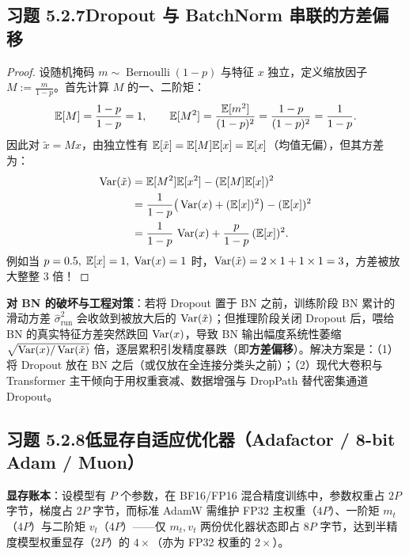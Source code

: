 \subsection*{习题 5.2.7\quad Dropout 与 BatchNorm 串联的方差偏移}
\begin{proof}
设随机掩码 $m \sim \operatorname{Bernoulli}(1-p)$ 与特征 $x$ 独立，定义缩放因子 $M := \frac{m}{1-p}$。首先计算 $M$ 的一、二阶矩：
\[
  \mathbb{E}[M] = \frac{1 - p}{1 - p} = 1, \qquad
  \mathbb{E}[M^2] = \frac{\mathbb{E}[m^2]}{(1-p)^2} = \frac{1 - p}{(1-p)^2} = \frac{1}{1 - p}.
\]
因此对 $\tilde{x} = M x$，由独立性有 $\mathbb{E}[\tilde{x}] = \mathbb{E}[M]\mathbb{E}[x] = \mathbb{E}[x]$（均值无偏），但其方差为：
\begin{align*}
  \operatorname{Var}(\tilde{x})
  &= \mathbb{E}[M^2]\mathbb{E}[x^2] - (\mathbb{E}[M]\mathbb{E}[x])^2 \\
  &= \frac{1}{1 - p}\big(\operatorname{Var}(x) + (\mathbb{E}[x])^2\big) - (\mathbb{E}[x])^2 \\
  &= \frac{1}{1 - p}\,\operatorname{Var}(x) + \frac{p}{1 - p}\,(\mathbb{E}[x])^2.
\end{align*}
例如当 $p = 0.5,\; \mathbb{E}[x] = 1,\; \operatorname{Var}(x) = 1$ 时，$\operatorname{Var}(\tilde{x}) = 2 \times 1 + 1 \times 1 = 3$，方差被放大整整 $3$ 倍！
\end{proof}
\textbf{对 BN 的破坏与工程对策}：若将 Dropout 置于 BN 之前，训练阶段 BN 累计的滑动方差 $\hat{\sigma}_{\text{run}}^2$ 会收敛到被放大后的 $\operatorname{Var}(\tilde{x})$；但推理阶段关闭 Dropout 后，喂给 BN 的真实特征方差突然跌回 $\operatorname{Var}(x)$，导致 BN 输出幅度系统性萎缩 $\sqrt{\operatorname{Var}(x)/\operatorname{Var}(\tilde{x})}$ 倍，逐层累积引发精度暴跌（即\textbf{方差偏移}）。解决方案是：（1）将 Dropout 放在 BN 之后（或仅放在全连接分类头之前）；（2）现代大卷积与 Transformer 主干倾向于用权重衰减、数据增强与 DropPath 替代密集通道 Dropout。

\subsection*{习题 5.2.8\quad 低显存自适应优化器（Adafactor / 8-bit Adam / Muon）}
\textbf{显存账本}：设模型有 $P$ 个参数，在 BF16/FP16 混合精度训练中，参数权重占 $2P$ 字节，梯度占 $2P$ 字节，而标准 AdamW 需维护 FP32 主权重（$4P$）、一阶矩 $m_t$（$4P$）与二阶矩 $v_t$（$4P$）——仅 $m_t, v_t$ 两份优化器状态即占 $8P$ 字节，达到半精度模型权重显存（$2P$）的 $4\times$（亦为 FP32 权重的 $2\times$）。

